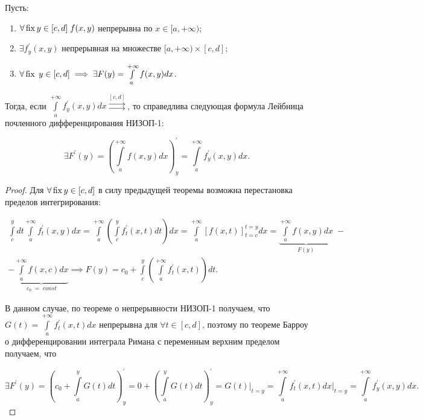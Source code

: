 \documentclass[../../main.tex]{subfiles}
\begin{document}
\begin{thm}
	Пусть: 
	\begin{enumerate}
		\item $\forall \operatorname{fix} y \in [c, d] \; f(x, y)$ непрерывна по $x \in [a, 
		+\infty)$;
		\item $\exists f^{'}_y (x, y)$ непрерывная на множестве $[a, +\infty) \times 
		[c, d]$;
		\item $\forall \operatorname{fix} \; y \in [c, d] \implies \exists F(y) = 
		\int\limits_a^{+\infty} f(x, y) dx$.
	\end{enumerate}
	Тогда, если $\displaystyle \int\limits_a^{+\infty} f^{'}_y (x, y) dx 
	\overset{[c, d]}{\rightrightarrows}$, то справедлива следующая формула 
	Лейбница почленного дифференцирования НИЗОП-1:
	
	\begin{equation} \label{lec11:2}
		\exists F^{'}(y) = \left( \int\limits_a^{+\infty} f(x, y) dx \right)^{'}_y = 
		\int\limits_a^{+\infty} f^{'}_y (x, y) dx. 
	\end{equation}
	
	\begin{proof}
		Для $\forall \operatorname{fix} y \in [c, d]$ в силу предыдущей теоремы возможна 
		перестановка пределов интегрирования:
		
		\begin{equation*}
		\begin{gathered}
		\int\limits_c^y dt \int\limits_a^{+\infty} f^{'}_{t}(x, y) dx =
		\int\limits_a^{+\infty} \left( \int\limits_c^y f^{'}_{t} (x, t) dt \right) 
		dx =
		\int\limits_a^{+\infty} \left[ f(x, t) \right]_{t = c}^{t = y} dx
		= \underbrace{\int\limits_a^{+\infty} f(x, y) dx}_{F(y)}\;- \\
		- \underbrace{\int\limits_a^{+\infty} f (x, c) dx}_{c_0\;=\;const} \implies 
		F(y) = c_0 + \int\limits_c^y \left( \int\limits_a^{+\infty} f^{'}_{t} (x, t) 
		\right) dt.
		\end{gathered}
		\end{equation*}
		
		В данном случае, по теореме о непрерывности НИЗОП-1 получаем, что $G(t) = 
		\int\limits_a^{+\infty} f_{t}^{'}(x, t) dx$ непрерывна для $\forall t \in 
		[c, d]$, поэтому по теореме Барроу о дифференцировании интеграла Римана с 
		переменным верхним пределом получаем, что
		
		\[
		\exists F^{'}(y) = \left(c_0 + \int\limits_a^y G(t)dt\right)^{'}_y = 0 + 
		\left(\int\limits_a^y G(t)dt\right)^{'}_y = G(t)\bigg|_{t = y} = 
		\int\limits_a^{+\infty} f^{'}_t (x, t) dx\bigg|_{t = y} = 
		\int\limits^{+\infty}_a  f^{'}_y (x, y) dx.
		\]
	\end{proof}
	
\end{thm}
\end{document}
